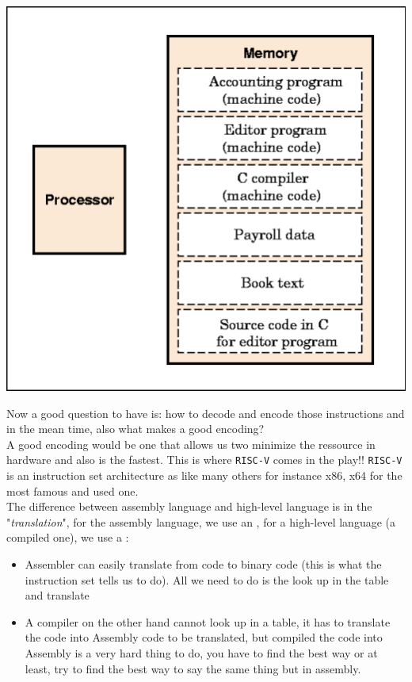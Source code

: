 \begin{center}
\includegraphics[scale=0.3]{screenshots/2025-10-11_5.png}
\end{center}
   Now a good question to have is: how to decode and encode those instructions and in the mean time, also what makes a good encoding? \\
A good encoding would be one that allows us two minimize the ressource in hardware and also is the fastest. This is where \texttt{RISC-V} comes in the play!! \texttt{RISC-V} is an instruction set architecture as like many others for instance x86, x64 for the most famous and used one.\\ 
The difference between assembly language and high-level language is in the "\textit{translation}", for the assembly language, we use an , for a high-level language (a compiled one), we use a :
\begin{itemize}
	\item Assembler can easily translate from code to binary code (this is what the instruction set tells us to do). All we need to do is the look up in the table and translate 
	\item A compiler on the other hand cannot look up in a table, it has to translate the code into Assembly code to be translated, but compiled the code into Assembly is a very hard thing to do, you have to find the best way or at least, try to find the best way to say the same thing but in assembly.
\end{itemize}


